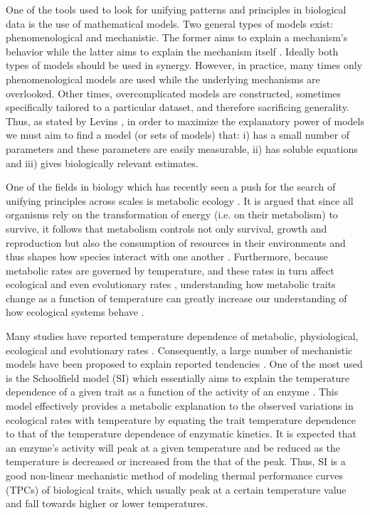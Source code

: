 \documentclass[11pt]{article}  %
\begin{document}
One of the tools used to look for unifying patterns and principles in biological data is the use of mathematical models. Two general types of models exist: phenomenological and mechanistic. The former aims to explain a mechanism's behavior while the latter aims to explain the mechanism itself \cite{Craver}. Ideally both types of models should be used in synergy. However, in practice, many times only phenomenological models are used while the underlying mechanisms are overlooked. Other times, overcomplicated models are constructed, sometimes specifically tailored to a particular dataset, and therefore sacrificing generality. Thus, as stated by Levins \cite{Levins}, in order to maximize the explanatory power of models we must aim to find a model (or sets of models) that: i) has a small number of parameters and these parameters are easily measurable, ii) has soluble equations and iii) gives biologically relevant estimates. 

One of the fields in biology which has recently seen a push for the search of unifying principles across scales is metabolic ecology \cite{Brown,Humphries}. It is argued that since all organisms rely on the transformation of energy (i.e. on their metabolism) to survive, it follows that metabolism controls not only survival, growth and reproduction but also the consumption of resources in their environments and thus shapes how species interact with one another \cite{Brown}. Furthermore, because metabolic rates are governed by temperature, and these rates in turn affect ecological \cite{Dell} and even evolutionary rates \cite{Gillooly}, understanding how metabolic traits change as a function of temperature can greatly increase our understanding of how ecological systems behave \cite{Hans,Portner,Allen}. 

Many studies have reported temperature dependence of metabolic, physiological, ecological and evolutionary rates \cite{Dell,Gillooly,Regniere,Gillooly2,Savage}. Consequently, a large number of mechanistic models have been proposed to explain reported tendencies \cite{DeLong}. One of the most used is the Schoolfield model (SI) \cite{Schoolfield} which essentially aims to explain the temperature dependence of a given trait as a function of the activity of an enzyme \cite{Kontopoulos}. This model effectively provides a metabolic explanation to the observed variations in ecological rates with temperature by equating the trait temperature dependence to that of the temperature dependence of enzymatic kinetics. It is expected that an enzyme's activity will peak at a given temperature and be reduced as the temperature is decreased or increased from the that of the peak. Thus, SI is a good non-linear mechanistic method of modeling thermal performance curves (TPCs) of biological traits, which usually peak at a certain temperature value and fall towards higher or lower temperatures. 
\end{document}
